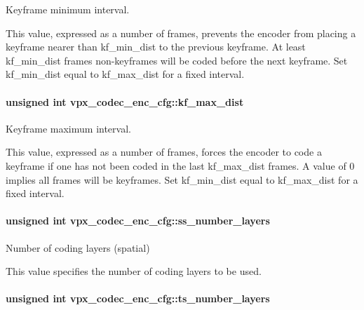 Keyframe minimum interval. 

This value, expressed as a number of frames, prevents the encoder from placing a keyframe nearer than kf\+\_\+min\+\_\+dist to the previous keyframe. At least kf\+\_\+min\+\_\+dist frames non-\/keyframes will be coded before the next keyframe. Set kf\+\_\+min\+\_\+dist equal to kf\+\_\+max\+\_\+dist for a fixed interval. \hypertarget{structvpx__codec__enc__cfg_ae018440136e271743376730413d25a9b}{
\paragraph[{kf\+\_\+max\+\_\+dist}]{\setlength{\rightskip}{0pt plus 5cm}unsigned int vpx\+\_\+codec\+\_\+enc\+\_\+cfg\+::kf\+\_\+max\+\_\+dist}}\label{structvpx__codec__enc__cfg_ae018440136e271743376730413d25a9b}


Keyframe maximum interval. 

This value, expressed as a number of frames, forces the encoder to code a keyframe if one has not been coded in the last kf\+\_\+max\+\_\+dist frames. A value of 0 implies all frames will be keyframes. Set kf\+\_\+min\+\_\+dist equal to kf\+\_\+max\+\_\+dist for a fixed interval. \hypertarget{structvpx__codec__enc__cfg_a1e5e1d00b22f2ba8c5c7230f31900f95}{
\paragraph[{ss\+\_\+number\+\_\+layers}]{\setlength{\rightskip}{0pt plus 5cm}unsigned int vpx\+\_\+codec\+\_\+enc\+\_\+cfg\+::ss\+\_\+number\+\_\+layers}}\label{structvpx__codec__enc__cfg_a1e5e1d00b22f2ba8c5c7230f31900f95}


Number of coding layers (spatial) 

This value specifies the number of coding layers to be used. \hypertarget{structvpx__codec__enc__cfg_a16d4549a30cbd585e3c3056ef873d8c7}{
\paragraph[{ts\+\_\+number\+\_\+layers}]{\setlength{\rightskip}{0pt plus 5cm}unsigned int vpx\+\_\+codec\+\_\+enc\+\_\+cfg\+::ts\+\_\+number\+\_\+layers}}\label{structvpx__codec__enc__cfg_a16d4549a30cbd585e3c3056ef873d8c7}


